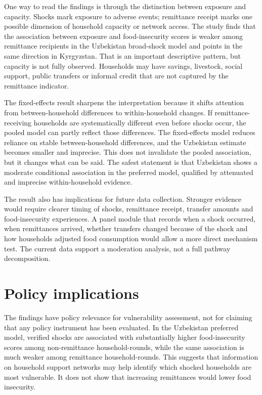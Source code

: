\documentclass[11pt]{article}
\begin{document}
One way to read the findings is through the distinction between exposure and capacity. Shocks mark exposure to adverse events; remittance receipt marks one possible dimension of household capacity or network access. The study finds that the association between exposure and food-insecurity scores is weaker among remittance recipients in the Uzbekistan broad-shock model and points in the same direction in Kyrgyzstan. That is an important descriptive pattern, but capacity is not fully observed. Households may have savings, livestock, social support, public transfers or informal credit that are not captured by the remittance indicator.

The fixed-effects result sharpens the interpretation because it shifts attention from between-household differences to within-household changes. If remittance-receiving households are systematically different even before shocks occur, the pooled model can partly reflect those differences. The fixed-effects model reduces reliance on stable between-household differences, and the Uzbekistan estimate becomes smaller and imprecise. This does not invalidate the pooled association, but it changes what can be said. The safest statement is that Uzbekistan shows a moderate conditional association in the preferred model, qualified by attenuated and imprecise within-household evidence.

The result also has implications for future data collection. Stronger evidence would require clearer timing of shocks, remittance receipt, transfer amounts and food-insecurity experiences. A panel module that records when a shock occurred, when remittances arrived, whether transfers changed because of the shock and how households adjusted food consumption would allow a more direct mechanism test. The current data support a moderation analysis, not a full pathway decomposition.

\section{Policy implications}

The findings have policy relevance for vulnerability assessment, not for claiming that any policy instrument has been evaluated. In the Uzbekistan preferred model, verified shocks are associated with substantially higher food-insecurity scores among non-remittance household-rounds, while the same association is much weaker among remittance household-rounds. This suggests that information on household support networks may help identify which shocked households are most vulnerable. It does not show that increasing remittances would lower food insecurity.
\end{document}
